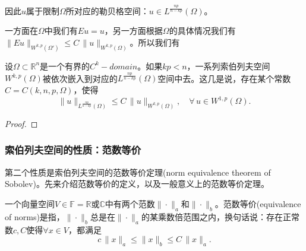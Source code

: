因此$u$属于限制$\Omega$所对应的勒贝格空间：$u \in L^{\frac{np}{n-kp}}(\Omega)$。

一方面在$\Omega$中我们有$E u = u$，另一方面根据$\Omega$的具体情况我们有$\big\| E u \big\|_{W^{k,p} (\Omega')} \le C \, \big\| u \big\|_{W^{k,p}(\Omega)}$。所以我们有
\begin{corollary}[索伯列夫空间的嵌入定理$C=C(k,n,p,\Omega)$]
设$\Omega \subset \mathbb{R}^n$是一个有界的$C^k-domain$。如果$kp < n$，一系列索伯列夫空间$W^{k,p}(\Omega)$被依次嵌入到对应的$L^{\frac{np}{n-kp}}(\Omega)$空间中去。这几是说，存在某个常数$C=C(k,n,p,\Omega)$，使得
\begin{equation}
  \label{eq:sobolev-embedding-theorem-c-k-n-p-omega}
  \big\| u \big\|_{L^{\frac{np}{n-kp}}(\Omega)} \le C \, \big\| u \big\|_{W^{k,p}(\Omega)}, \quad \forall \, u \in W^{1,p}(\Omega).
\end{equation}
\end{corollary}
\begin{proof}

\end{proof}




















\subsubsection{索伯列夫空间的性质：范数等价}
第二个性质是索伯列夫空间的范数等价定理(norm equivalence theorem of Sobolev)。先来介绍范数等价的定义，以及一般意义上的范数等价定理。
\begin{definition}[范数等价]
  \label{definition:equivalence-norm-def}
  一个向量空间$V \in \mathbb{F}=\mathbb{R}或\mathbb{C}$中有两个范数$\| \cdot \|_a$和$\| \cdot \|_b$。范数等价(equivalence of norms)是指，$\| \cdot \|_b$总是在$\| \cdot \|_a$的某乘数倍范围之内，换句话说：存在正常数$c,C$使得$\forall x \in V$，都满足
  \begin{equation*}
    c \, \|x\|_a \le \|x\|_b \le C \, \| x \|_a.
  \end{equation*}
\end{definition}

